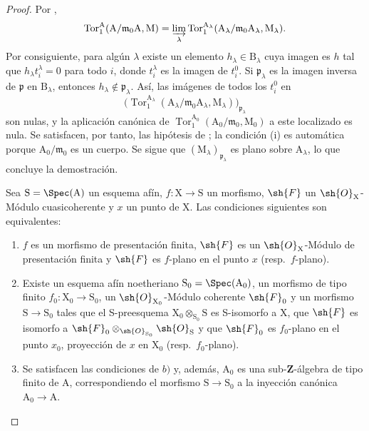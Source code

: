 \begin{proof}
Por ,
\[
  \operatorname{Tor}_1^\mathrm A
  (\mathrm A/\mathfrak m_0\mathrm A,\mathrm M)
  =\varinjlim_\lambda
  \operatorname{Tor}_1^{\mathrm A_\lambda}
  (\mathrm A_\lambda/\mathfrak m_0\mathrm A_\lambda,
   \mathrm M_\lambda).
\]
Por consiguiente, para algún $\lambda$ existe un elemento
$h_\lambda\in\mathrm B_\lambda$ cuya imagen es $h$ tal que
$h_\lambda t_i^\lambda=0$ para todo $i$, donde $t_i^\lambda$ es la
imagen de $t_i^0$. Si $\mathfrak p_\lambda$ es la imagen inversa de
$\mathfrak p$ en $\mathrm B_\lambda$, entonces
$h_\lambda\notin\mathfrak p_\lambda$. Así, las imágenes de todos los
$t_i^0$ en
\[
  \bigl(\operatorname{Tor}_1^{\mathrm A_\lambda}
  (\mathrm A_\lambda/\mathfrak m_0\mathrm A_\lambda,
   \mathrm M_\lambda)\bigr)_{\mathfrak p_\lambda}
\]
son nulas, y la aplicación canónica de
$\operatorname{Tor}_1^{\mathrm A_0}
(\mathrm A_0/\mathfrak m_0,\mathrm M_0)$ a este localizado es nula.
Se satisfacen, por tanto, las hipótesis de ; la condición
(i) es automática porque $\mathrm A_0/\mathfrak m_0$ es un cuerpo.
Se sigue que $(\mathrm M_\lambda)_{\mathfrak p_\lambda}$ es plano
sobre $\mathrm A_\lambda$, lo que concluye la demostración.

\begin{corollary}[11.2.7]
\label{IV.11.2.7}
Sea $\mathrm{S}=\Spec(\mathrm{A})$ un esquema afín, $f:\mathrm{X}\to\mathrm{S}$ un morfismo, $\sh{F}$ un $\sh{O}_\mathrm{X}$-Módulo cuasicoherente y $x$ un punto de $\mathrm{X}$. Las condiciones siguientes son equivalentes:
\begin{enumerate}[label=\emph{\alph*)}]
  \item $f$ es un morfismo de presentación finita, $\sh{F}$ es un $\sh{O}_\mathrm{X}$-Módulo de presentación finita y $\sh{F}$ es $f$-plano en el punto $x$ (resp.\ $f$-plano).
  \item Existe un esquema afín noetheriano $\mathrm{S}_0=\Spec(\mathrm{A}_0)$, un morfismo de tipo finito $f_0:\mathrm{X}_0\to\mathrm{S}_0$, un $\sh{O}_{\mathrm{X}_0}$-Módulo coherente $\sh{F}_0$ y un morfismo $\mathrm{S}\to\mathrm{S}_0$ tales que el S-preesquema $\mathrm{X}_0\otimes_{\mathrm{S}_0}\mathrm{S}$ es S-isomorfo a $\mathrm{X}$, que $\sh{F}$ es isomorfo a $\sh{F}_0\otimes_{\sh{O}_{\mathrm{S}_0}}\sh{O}_\mathrm{S}$ y que $\sh{F}_0$ es $f_0$-plano en el punto $x_0$, proyección de $x$ en $\mathrm{X}_0$ (resp.\ $f_0$-plano).
  \item Se satisfacen las condiciones de $b)$ y, además, $\mathrm{A}_0$ es una sub-$\mathbf{Z}$-álgebra de tipo finito de $\mathrm{A}$, correspondiendo el morfismo $\mathrm{S}\to\mathrm{S}_0$ a la inyección canónica $\mathrm{A}_0\to\mathrm{A}$.
\end{enumerate}
\end{corollary}


\end{proof}
